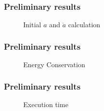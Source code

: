 \begin{frame}
    \frametitle{Preliminary results}
    \begin{figure}
        \centering
        \label{fig:init-time}
        \caption{Initial $a$ and $\dot{a}$ calculation}
    \end{figure}
\end{frame}

\begin{frame}
    \frametitle{Preliminary results}
    \begin{figure}
        \centering
        \label{fig:init-time}
        \caption{Energy Conservation}
    \end{figure}
\end{frame}

\begin{frame}
    \frametitle{Preliminary results}
    \begin{figure}
        \centering
        \label{fig:init-time}
        \caption{Execution time}
    \end{figure}
\end{frame}
